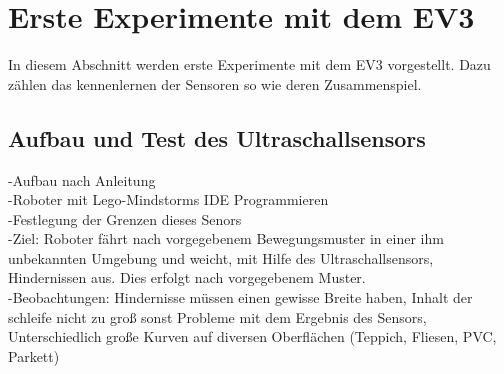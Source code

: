 \chapter{Erste Experimente mit dem EV3}
In diesem Abschnitt werden erste Experimente mit dem EV3 vorgestellt. Dazu zählen das kennenlernen der Sensoren so wie deren Zusammenspiel. 
\section{Aufbau und Test des Ultraschallsensors}
-Aufbau nach Anleitung\\
-Roboter mit Lego-Mindstorms IDE Programmieren \\
-Festlegung der Grenzen dieses Senors\\
-Ziel: Roboter fährt nach vorgegebenem Bewegungsmuster in einer ihm unbekannten Umgebung und weicht, mit Hilfe des Ultraschallsensors, Hindernissen aus. Dies erfolgt nach vorgegebenem Muster.\\ 
-Beobachtungen: Hindernisse müssen einen gewisse Breite haben, Inhalt der schleife nicht zu groß sonst Probleme mit dem Ergebnis des Sensors, Unterschiedlich große Kurven auf diversen Oberflächen (Teppich, Fliesen, PVC, Parkett)  \\